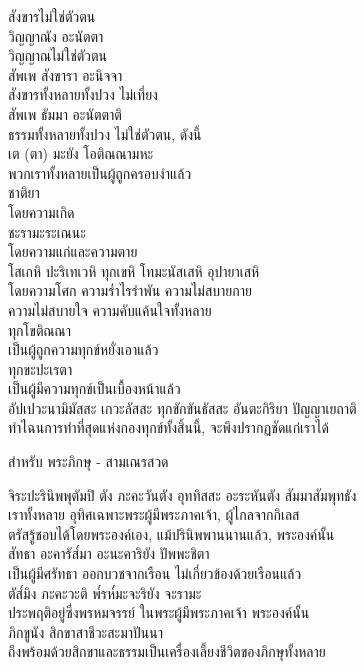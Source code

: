 \documentclass{article}
\begin{document}
\indent สังขารไม่ใช่ตัวตน\\
วิญญาณัง อะนัตตา\\
\indent วิญญาณไม่ใช่ตัวตน\\
สัพเพ สังขารา อะนิจจา\\
\indent สังขารทั้งหลายทั้งปวง ไม่เที่ยง\\
สัพเพ ธัมมา อะนัตตาติ\\
\indent ธรรมทั้งหลายทั้งปวง ไม่ใช่ตัวตน, ดังนี้\\
เต (ตา)  มะยัง โอติณณามหะ\\
\indent พวกเราทั้งหลายเป็นผู้ถูกครอบงำแล้ว\\
ชาติยา\\
\indent โดยความเกิด\\
ชะรามะระเณนะ\\
\indent โดยความแก่และความตาย\\
โสเกหิ ปะริเทเวหิ ทุกเขหิ โทมะนัสเสหิ อุปายาเสหิ\\
\indent โดยความโศก ความร่ำไรรำพัน ความไม่สบายกาย\\
ความไม่สบายใจ ความคับแค้นใจทั้งหลาย\\
ทุกโขติณณา\\
\indent เป็นผู้ถูกความทุกข์หยั่งเอาแล้ว\\
ทุกขะปะเรตา\\
\indent เป็นผู้มีความทุกข์เป็นเบื้องหน้าแล้ว\\
อัปเปวะนามิมัสสะ เกวะลัสสะ ทุกขักขันธัสสะ อันตะกิริยา ปัญญาเยถาติ\\
\indent ทำไฉนการทำที่สุดแห่งกองทุกข์ทั้งสิ้นนี้, จะพึงปรากฏชัดแก่เราได้\\
\begin{center}สำหรับ พระภิกษุ - สามเณรสวด\end{center}
จิระปะรินิพพุตัมปิ ตัง ภะคะวันตัง อุททิสสะ อะระหันตัง สัมมาสัมพุทธัง\\
\indent เราทั้งหลาย อุทิศเฉพาะพระผู้มีพระภาคเจ้า, ผู้ไกลจากกิเลส\\
ตรัสรู้ชอบได้โดยพระองค์เอง, แม้ปรินิพพานนานแล้ว, พระองค์นั้น\\
สัทธา อะคารัส๎มา อะนะคาริยัง ปัพพะชิตา\\
\indent เป็นผู้มีศรัทธา ออกบวชจากเรือน ไม่เกี่ยวข้องด้วยเรือนแล้ว\\
ตัส๎มิง ภะคะวะติ พ๎รห๎มะจะริยัง จะรามะ\\
\indent ประพฤติอยู่ซึ่งพรหมจรรย์ ในพระผู้มีพระภาคเจ้า พระองค์นั้น\\
ภิกขูนัง สิกขาสาชีวะสะมาปันนา\\
\indent ถึงพร้อมด้วยสิกขาและธรรมเป็นเครื่องเลี้ยงชีวิตของภิกษุทั้งหลาย\\
\end{document}
